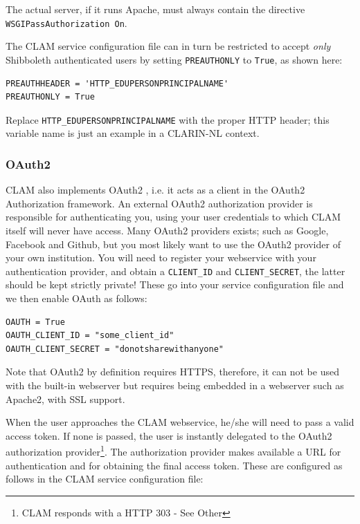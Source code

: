 \documentclass[a4paper,12pt,twoside,openright]{report}
\begin{document}
The actual server, if it runs Apache, must always contain the directive \\
\texttt{WSGIPassAuthorization On}.

The CLAM service configuration file can in turn be restricted to accept \emph{only}
Shibboleth authenticated users by setting \texttt{PREAUTHONLY} to
\texttt{True}, as shown here:

{ \small
\begin{verbatim}
PREAUTHHEADER = 'HTTP_EDUPERSONPRINCIPALNAME'
PREAUTHONLY = True
\end{verbatim}
}

Replace \texttt{HTTP\_EDUPERSONPRINCIPALNAME} with the proper HTTP header; this
variable name is just an example in a CLARIN-NL context.

\subsubsection{OAuth2}

CLAM also implements OAuth2 \cite{OAUTH2}, i.e. it acts as a client in the
OAuth2 Authorization framework. An external OAuth2 authorization provider is
responsible for authenticating you, using your user credentials to which CLAM
itself will never have access. Many OAuth2 providers exists; such as Google,
Facebook and Github, but you most likely want to use the OAuth2 provider of
your own institution. You will need to register your webservice with your
authentication provider, and obtain a \texttt{CLIENT\_ID} and
\texttt{CLIENT\_SECRET}, the latter should be kept strictly private! These go
into your service configuration file and we then enable OAuth as follows: 

{ \small
\begin{verbatim}
OAUTH = True
OAUTH_CLIENT_ID = "some_client_id"
OAUTH_CLIENT_SECRET = "donotsharewithanyone"
\end{verbatim}
}

Note that OAuth2 by definition requires HTTPS, therefore, it can not be used
with the built-in webserver but requires being embedded in a webserver such as
Apache2, with SSL support.

When the user approaches the CLAM webservice, he/she will need to pass a valid
access token. If none is passed, the user is instantly delegated to the OAuth2
authorization provider\footnote{CLAM responds with a HTTP 303 - See Other}.
The authorization provider makes available a URL for authentication and for
obtaining the final access token. These are configured as follows in the CLAM
service configuration file: 
\end{document}

